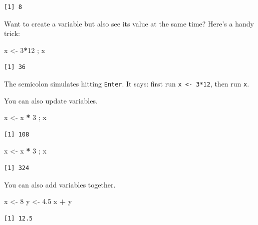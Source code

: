 \documentclass[
]{book}
\newenvironment{Shaded}{\begin{snugshade}}{\end{snugshade}}
\newcommand{\DecValTok}[1]{\textcolor[rgb]{0.00,0.00,0.81}{#1}}
\newcommand{\FloatTok}[1]{\textcolor[rgb]{0.00,0.00,0.81}{#1}}
\newcommand{\NormalTok}[1]{#1}
\newcommand{\OperatorTok}[1]{\textcolor[rgb]{0.81,0.36,0.00}{\textbf{#1}}}
\newcommand{\StringTok}[1]{\textcolor[rgb]{0.31,0.60,0.02}{#1}}
\begin{document}
\begin{verbatim}
[1] 8
\end{verbatim}

Want to create a variable but also see its value at the same time? Here's a handy trick:

\begin{Shaded}
\begin{Highlighting}[]
\NormalTok{x <-}\StringTok{ }\DecValTok{3}\OperatorTok{*}\DecValTok{12}\NormalTok{ ; x}
\end{Highlighting}
\end{Shaded}

\begin{verbatim}
[1] 36
\end{verbatim}

The semicolon simulates hitting \texttt{Enter}. It says: first run \texttt{x\ \textless{}-\ 3*12}, then run \texttt{x}.

You can also update variables.

\begin{Shaded}
\begin{Highlighting}[]
\NormalTok{x <-}\StringTok{ }\NormalTok{x }\OperatorTok{*}\StringTok{ }\DecValTok{3}\NormalTok{ ; x}
\end{Highlighting}
\end{Shaded}

\begin{verbatim}
[1] 108
\end{verbatim}

\begin{Shaded}
\begin{Highlighting}[]
\NormalTok{x <-}\StringTok{ }\NormalTok{x }\OperatorTok{*}\StringTok{ }\DecValTok{3}\NormalTok{ ; x}
\end{Highlighting}
\end{Shaded}

\begin{verbatim}
[1] 324
\end{verbatim}

You can also add variables together.

\begin{Shaded}
\begin{Highlighting}[]
\NormalTok{x <-}\StringTok{ }\DecValTok{8}
\NormalTok{y <-}\StringTok{ }\FloatTok{4.5}
\NormalTok{x }\OperatorTok{+}\StringTok{ }\NormalTok{y}
\end{Highlighting}
\end{Shaded}

\begin{verbatim}
[1] 12.5
\end{verbatim}
\end{document}

